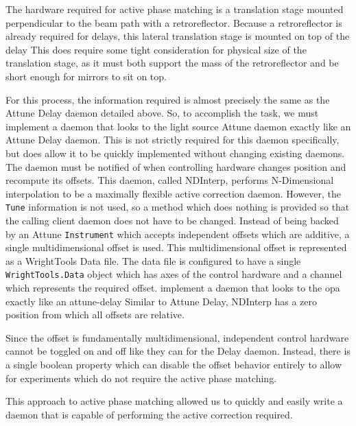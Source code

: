 The hardware required for active phase matching is a translation stage mounted perpendicular to the beam path with a retroreflector.
Because a retroreflector is already required for delays, this lateral translation stage is mounted on top of the delay
This does require some tight consideration for physical size of the translation stage, as it must both support the mass of the retroreflector and be short enough for mirrors to sit on top.

For this process, the information required is almost precisely the same as the Attune Delay daemon detailed above.
So, to accomplish the task, we must implement a daemon that looks to the light source Attune daemon exactly like an Attune Delay daemon.
This is not strictly required for this daemon specifically, but does allow it to be quickly implemented without changing existing daemons.
The daemon must be notified of when controlling hardware changes position and recompute its offsets.
This daemon, called NDInterp, performs N-Dimensional interpolation to be a maximally flexible active correction daemon.
However, the \texttt{Tune} information is not used, so a method which does nothing is provided so that the calling client daemon does not have to be changed. 
Instead of being backed by an Attune \texttt{Instrument} which accepts independent offsets which are additive, a single multidimensional offset is used.
This multidimensional offset is represented as a WrightTools Data file.
The data file is configured to have a single \texttt{WrightTools.Data} object which has axes of the control hardware and a channel which represents the required offset.
implement a daemon that looks to the opa exactly like an attune-delay
Similar to Attune Delay, NDInterp has a zero position from which all offsets are relative.

Since the offset is fundamentally multidimensional, independent control hardware cannot be toggled on and off like they can for the Delay daemon.
Instead, there is a single boolean \yaq{} property which can disable the offset behavior entirely to allow for experiments which do not require the active phase matching.

This approach to active phase matching allowed us to quickly and easily write a daemon that is capable of performing the active correction required.

\clearpage
